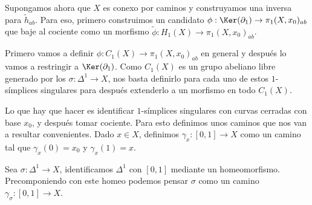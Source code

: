 





Supongamos ahora que $X$ es conexo por caminos y construyamos una inversa para $\tilde{h}_{ab}$. Para eso, primero construimos un candidato $\phi: \Ker(\partial_1)\to \pi_1(X,x_0)_{ab}$ que baje al cociente como un morfismo $\tilde{\phi}: H_1(X)\to\pi_1(X,x_0)_{ab}$.

Primero vamos a definir $\phi:C_1(X)\to\pi_1(X,x_0)_{ab}$ en general y después lo vamos a restringir a $\Ker(\partial_1)$. Como $C_1(X)$ es un grupo abeliano libre generado por los $\sigma:\Delta^1\to X$, nos basta definirlo para cada uno de estos $1$-símplices singulares para después extenderlo a un morfismo en todo $C_1(X)$.

Lo que hay que hacer es identificar $1$-símplices singulares con curvas cerradas con base $x_0$, y después tomar cociente. Para esto definimos unos caminos que nos van a resultar convenientes. Dado $x\in X$, definimos $\gamma_x:[0,1]\to X$ como un camino tal que $\gamma_x(0)=x_0$ y $\gamma_x(1)=x$.

Sea $\sigma:\Delta^1\to X$, identificamos $\Delta^1$ con $[0,1]$ mediante un homeomorfismo. Precomponiendo con este homeo podemos pensar $\sigma$ como un camino $\gamma_\sigma:[0,1]\to X$.

